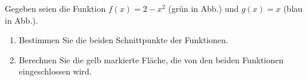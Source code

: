 \begin{ExerciseBlock}
Gegeben seien die Funktion $f(x) = 2-x^2$ (grün in Abb.) und $g(x) = x$ (blau in Abb.).
	
\begin{center}
\end{center}

\begin{enumerate}[label=\alph*)]
	
	\item Bestimmen Sie die beiden Schnittpunkte der Funktionen. 
	
	\item Berechnen Sie die gelb markierte Fläche, die von den beiden Funktionen eingeschlossen wird.
	
\end{enumerate}

\end{ExerciseBlock}
